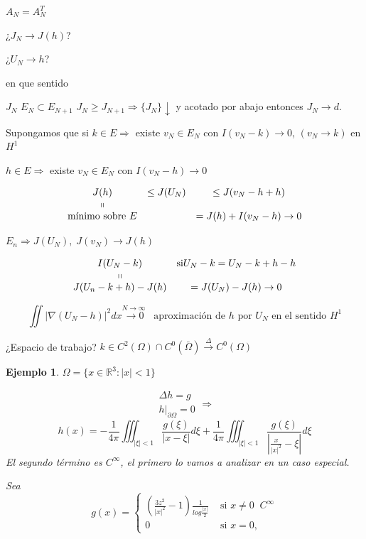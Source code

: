 \documentclass[a4paper,10pt]{book}
\newtheorem{ejemplo}{Ejemplo}
\begin{document}
\begin{enumerate}
$A_N= A_N^{T}$

¿$J_N \rightarrow J(h) $?

¿$U_N \rightarrow h$?

en que sentido

$J_N$ $ E_N \subset E_{N+1}$  $J_N \geq J_{N+1} \Rightarrow \{J_N\}\downarrow $ y acotado por abajo entonces
$J_N\rightarrow d$.

Supongamos que si $k\in E \Rightarrow $ existe $v_N \in E_N$ con $I(v_N -k) \rightarrow 0$,  $(v_N\rightarrow k )$ en $H^1$

$h\in E \Rightarrow $ existe $v_N \in E_N $ con $I(v_N-h )\rightarrow 0$

\[
\begin{array}{ccc}
     J(h) & \leq J(U_N)  & \leq J(v_N-h+h)  \\
      \shortparallel &  & \\
      \text{mínimo sobre } E& & = J(h) +I ( v_N-h)  \rightarrow 0
\end{array}
\]

$E_n \Rightarrow J(U_N), \; J(v_N) \rightarrow J(h)$ 

\[
\begin{array}{cc}
I(U_N-k)  & \text{si}  U_N-k = U_N -k +h - h \\
\shortparallel &   \\
J(U_n-k+h) -J(h) &= J(U_N)-J(h) \rightarrow 0
\end{array}
\]

\[
\iint |\nabla ( U_N -h ) | ^2 dx  \overset{N\rightarrow \infty}{ \rightarrow 0} \;\;\; \text{aproximación de $h$ por $U_N$ en el sentido $H^1$}
\]

¿Espacio de trabajo?   $ k \in C^2 (\Omega) \cap  C^0 (\bar{\Omega}) \overset{\Delta}{\rightarrow} C^0(\Omega)$


\begin{ejemplo}
    $\Omega = \{x \in \mathbb{R}^3  : |x|<1  \}$

\[
    \begin{array}{c}
         \Delta h= g  \\
         h|_{\partial \Omega }=0  
    \end{array} \Rightarrow 
\]
 \[
   h(x) = -\frac{1}{4\pi} \iiint_{|\xi|<1 } \frac{g(\xi)}{ |x-\xi|} d\xi  + \frac{1}{4\pi} \iiint_{|\xi|<1 } \frac{g(\xi)}{ |\frac{x}{|x|^2}-\xi|}   d\xi
\]
El segundo término es $C^\infty$, el primero lo vamos a analizar en un caso especial.

    Sea 
\[
 g(x)  = \left\{\begin{aligned}
        \left(  \frac{3 z^2}{ |x|^2} -1\right) \frac{1}{log \frac{|x|}{2} }  & \text{ si } x\neq 0 \;\; C^\infty\\
        0 & \text{ si } x = 0,
       \end{aligned}
 \right.
\]


\end{ejemplo}
\end{enumerate}
\end{document}
